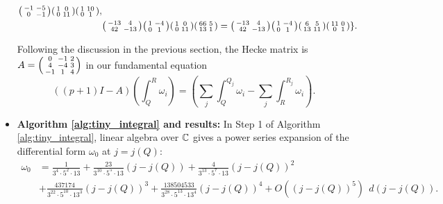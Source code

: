 \begin{itemize}
\begin{align*}
\begin{psmallmatrix}
-1 & -5 \\ 0 & -1
\end{psmallmatrix}
\begin{psmallmatrix}
1 & 0 \\ 0 & 11
\end{psmallmatrix}
\begin{psmallmatrix}
1 & 10 \\ 0 & 1
\end{psmallmatrix}, \\ &
\begin{psmallmatrix}
-13 & 4 \\ 42 & -13
\end{psmallmatrix}
\begin{psmallmatrix}
1 & -4 \\ 0 & 1
\end{psmallmatrix}
\begin{psmallmatrix}
1 & 0 \\ 0 & 11
\end{psmallmatrix}
\begin{psmallmatrix}
66 & 5 \\ 13 & 1
\end{psmallmatrix} = \begin{psmallmatrix}
-13 & 4 \\ 42 & -13
\end{psmallmatrix}
\begin{psmallmatrix}
1 & -4 \\ 0 & 1
\end{psmallmatrix}
\begin{psmallmatrix}
6 &  5 \\ 13 & 11
\end{psmallmatrix}
\begin{psmallmatrix}
11 & 0 \\ 0 & 1
\end{psmallmatrix}
\}.
\end{align*}

Following the discussion in the previous section, the Hecke matrix is $A = \begin{psmallmatrix}
0 & -1 & 2 \\ 4 & -4 & 3 \\ -1 & 1 & 4
\end{psmallmatrix}$ in our fundamental equation $$((p+1)I - A) (\int_Q^R \omega_i) = (\sum_j \int_Q^{Q_j} \omega_i - \sum_j \int_R^{R_j} \omega_i).$$

\item \textbf{Algorithm \ref{alg:tiny_integral} and results:} In Step 1 of Algorithm \ref{alg:tiny_integral}, linear algebra over $\mathbb{C}$ gives a power series expansion of the differential form $\omega_0$ at $j=j(Q)$:\begin{align*}
    \omega_0 &= \frac{1}{3^4 \cdot 5^2 \cdot 13
} +  \frac{23}{3^{10} \cdot 5^5 \cdot 13}(j-j(Q)) +  \frac{4}{3^{13} \cdot 5^7 \cdot 13}(j-j(Q))^2 \\ &+ \frac{437174}{3^{22} \cdot 5^{10} \cdot 13^3
}(j-j(Q))^3 + \frac{138504533 }{3^{28} \cdot 5^{13} \cdot 13^4
}(j-j(Q))^4 + O((j-j(Q))^5) \ \ d(j-j(Q)).
\end{align*}


\end{itemize}
